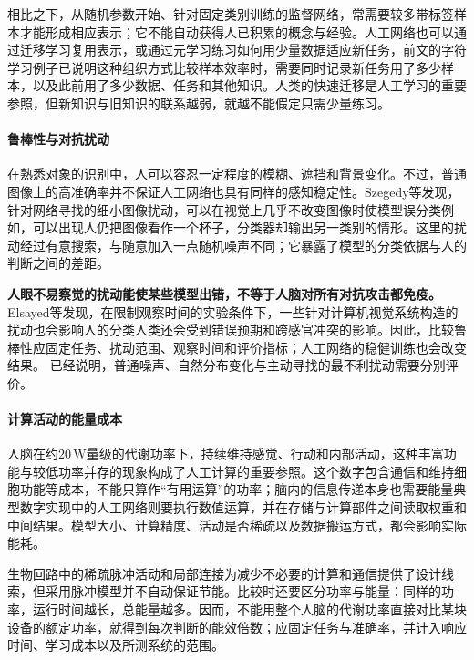 相比之下，从随机参数开始、针对固定类别训练的监督网络，常需要较多带标签样本才能形成相应表示；它不能自动获得人已积累的概念与经验。人工网络也可以通过迁移学习复用表示，或通过元学习练习如何用少量数据适应新任务，前文的字符学习例子已说明这种组织方式比较样本效率时，需要同时记录新任务用了多少样本，以及此前用了多少数据、任务和其他知识。人类的快速迁移是人工学习的重要参照，但新知识与旧知识的联系越弱，就越不能假定只需少量练习。

\paragraph{鲁棒性与对抗扰动}
在熟悉对象的识别中，人可以容忍一定程度的模糊、遮挡和背景变化。不过，普通图像上的高准确率并不保证人工网络也具有同样的感知稳定性。Szegedy等发现，针对网络寻找的细小图像扰动，可以在视觉上几乎不改变图像时使模型误分类例如，可以出现人仍把图像看作一个杯子，分类器却输出另一类别的情形。这里的扰动经过有意搜索，与随意加入一点随机噪声不同；它暴露了模型的分类依据与人的判断之间的差距。

\textbf{人眼不易察觉的扰动能使某些模型出错，不等于人脑对所有对抗攻击都免疫。}Elsayed等发现，在限制观察时间的实验条件下，一些针对计算机视觉系统构造的扰动也会影响人的分类人类还会受到错误预期和跨感官冲突的影响。因此，比较鲁棒性应固定任务、扰动范围、观察时间和评价指标；人工网络的稳健训练也会改变结果。
已经说明，普通噪声、自然分布变化与主动寻找的最不利扰动需要分别评价。

\paragraph{计算活动的能量成本}
人脑在约$20\,\mathrm{W}$量级的代谢功率下，持续维持感觉、行动和内部活动，这种丰富功能与较低功率并存的现象构成了人工计算的重要参照。这个数字包含通信和维持细胞功能等成本，不能只算作“有用运算”的功率；脑内的信息传递本身也需要能量典型数字实现中的人工网络则要执行数值运算，并在存储与计算部件之间读取权重和中间结果。模型大小、计算精度、活动是否稀疏以及数据搬运方式，都会影响实际能耗。

生物回路中的稀疏脉冲活动和局部连接为减少不必要的计算和通信提供了设计线索，但采用脉冲模型并不自动保证节能。比较时还要区分功率与能量：同样的功率，运行时间越长，总能量越多。因而，不能用整个人脑的代谢功率直接对比某块设备的额定功率，就得到每次判断的能效倍数；应固定任务与准确率，并计入响应时间、学习成本以及所测系统的范围。


